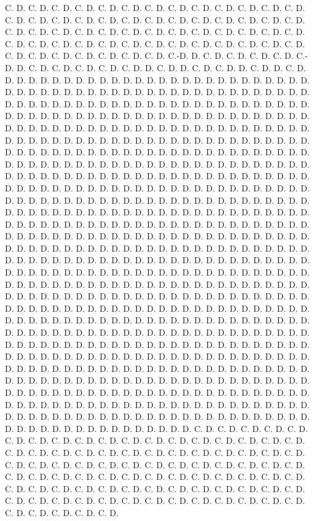\documentclass[12pt, a4paper]{report}
\begin{document}
\begin{thebibliography}{99}
C. D. C. D. C. D. C. D. C. D. C. D. C. D. C. D. C. D. C. D. C. D. C. D. C. D. C. D. C. D. C. D. C. D. C. D. C. D. C. D. C. D. C. D. C. D. C. D. C. D. C. D. C. D. C. D. C. D. C. D. C. D. C. D. C. D. C. D. C. D. C. D. C. D. C. D. C. D. C. D. C. D. C. D. C. D. C. D. C. D. C. D. C. D. C. D. C. D. C. D. C. D. C. D. C. D. C. D. C. D. C. D. C. D. C. D. C. D. C.-D. D. C. D. C. D. C. D. C. D. C.-D. D. C. D. C. D. C. D. C. D. C. D. D. C. D. D. C. D. C. D. D. C. D. D. C. D. D. D. D. D. D. D. D. D. D. D. D. D. D. D. D. D. D. D. D. D. D. D. D. D. D. D. D. D. D. D. D. D. D. D. D. D. D. D. D. D. D. D. D. D. D. D. D. D. D. D. D. D. D. D. D. D. D. D. D. D. D. D. D. D. D. D. D. D. D. D. D. D. D. D. D. D. D. D. D. D. D. D. D. D. D. D. D. D. D. D. D. D. D. D. D. D. D. D. D. D. D. D. D. D. D. D. D. D. D. D. D. D. D. D. D. D. D. D. D. D. D. D. D. D. D. D. D. D. D. D. D. D. D. D. D. D. D. D. D. D. D. D. D. D. D. D. D. D. D. D. D. D. D. D. D. D. D. D. D. D. D. D. D. D. D. D. D. D. D. D. D. D. D. D. D. D. D. D. D. D. D. D. D. D. D. D. D. D. D. D. D. D. D. D. D. D. D. D. D. D. D. D. D. D. D. D. D. D. D. D. D. D. D. D. D. D. D. D. D. D. D. D. D. D. D. D. D. D. D. D. D. D. D. D. D. D. D. D. D. D. D. D. D. D. D. D. D. D. D. D. D. D. D. D. D. D. D. D. D. D. D. D. D. D. D. D. D. D. D. D. D. D. D. D. D. D. D. D. D. D. D. D. D. D. D. D. D. D. D. D. D. D. D. D. D. D. D. D. D. D. D. D. D. D. D. D. D. D. D. D. D. D. D. D. D. D. D. D. D. D. D. D. D. D. D. D. D. D. D. D. D. D. D. D. D. D. D. D. D. D. D. D. D. D. D. D. D. D. D. D. D. D. D. D. D. D. D. D. D. D. D. D. D. D. D. D. D. D. D. D. D. D. D. D. D. D. D. D. D. D. D. D. D. D. D. D. D. D. D. D. D. D. D. D. D. D. D. D. D. D. D. D. D. D. D. D. D. D. D. D. D. D. D. D. D. D. D. D. D. D. D. D. D. D. D. D. D. D. D. D. D. D. D. D. D. D. D. D. D. D. D. D. D. D. D. D. D. D. D. D. D. D. D. D. D. D. D. D. D. D. D. D. D. D. D. D. D. D. D. D. D. D. D. D. D. D. D. D. D. D. D. D. D. D. D. D. D. D. D. D. D. D. D. D. D. D. D. D. D. D. D. D. D. D. D. D. D. D. D. D. D. D. D. D. D. D. D. D. D. D. D. D. D. D. D. D. D. D. D. D. D. D. D. D. D. D. D. D. D. D. D. D. D. D. D. D. D. D. D. D. D. D. D. D. D. D. D. D. D. D. D. D. D. D. D. D. D. D. D. D. D. D. D. D. D. D. D. D. D. D. D. D. D. D. D. D. D. D. D. D. D. D. D. D. D. D. D. D. D. D. D. D. D. D. D. D. D. D. D. D. D. D. D. D. D. D. D. D. D. D. D. D. D. D. D. D. D. D. D. D. D. D. D. D. D. D. D. D. D. D. D. D. D. D. D. D. D. D. D. D. D. D. D. D. D. D. D. D. D. D. D. D. D. D. D. D. D. D. D. D. D. D. D. D. D. D. D. D. D. D. D. D. D. D. D. D. D. D. D. D. D. D. D. D. D. D. D. D. D. D. D. D. D. D. D. D. D. D. D. D. D. D. D. D. D. D. D. D. D. D. D. D. D. D. D. D. D. D. D. D. D. D. D. D. D. D. D. D. D. D. D. D. D. D. D. D. D. D. D. D. D. D. D. D. D. D. D. D. D. D. D. D. D. D. D. D. D. D. D. D. C. D. C. D. C. D. C. D. C. D. C. D. C. D. C. D. C. D. C. D. C. D. C. D. C. D. C. D. C. D. C. D. C. D. C. D. C. D. C. D. C. D. C. D. C. D. C. D. C. D. C. D. C. D. C. D. C. D. C. D. C. D. C. D. C. D. C. D. C. D. C. D. C. D. C. D. C. D. C. D. C. D. C. D. C. D. C. D. C. D. C. D. C. D. C. D. C. D. C. D. C. D. C. D. C. D. C. D. C. D. C. D. C. D. C. D. C. D. C. D. C. D. C. D. C. D. C. D. C. D. C. D. C. D. C. D. C. D. C. D. C. D. C. D. C. D. C. D. C. D. C. D. C. D. C. D. C. D. C. D. C. D. C. D. C. D. C. D. C. D. C. D. C. D. C. D. 
\end{thebibliography}
\end{document}
